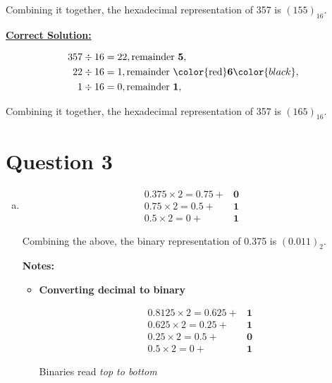 \documentclass[12pt]{article}
\begin{document}
\begin{enumerate}[a.]
    Combining it together, the hexadecimal representation of 357 is $(155)_{16}$.

    \begin{mdframed}
        \underline{\textbf{Correct Solution:}}

        \bigskip

        \begin{align*}
            357 \div 16 &= 22, \text{remainder \textbf{5}},\\
            22 \div 16 &= 1, \text{remainder \color{red}\textbf{6}}\color{black},\\
            1 \div 16 &= 0, \text{remainder \textbf{1}},\\
        \end{align*}

        Combining it together, the hexadecimal representation of 357 is \color{red}\textbf{$(165)_{16}$}\color{black}.

    \end{mdframed}

\end{enumerate}

\section*{Question 3}
\begin{enumerate}[a.]
    \item
    \setcounter{equation}{0}
    \begin{align}
        0.375 \times 2 = 0.75 + &\textbf{0}\\
        0.75 \times 2 = 0.5 + &\textbf{1}\\
        0.5 \times 2 = 0 + &\textbf{1}
    \end{align}

    Combining the above, the binary representation of 0.375 is $(0.011)_2$.

    \textbf{Notes:}
    \begin{itemize}
        \item \textbf{Converting decimal to binary}

        \begin{align}
            0.8125 \times 2 = 0.625 + &\textbf{1}\\
            0.625 \times 2 = 0.25 + &\textbf{1}\\
            0.25 \times 2 = 0.5 + &\textbf{0}\\
            0.5 \times 2 = 0 + &\textbf{1}
        \end{align}

        Binaries read \textit{top to bottom}
    \end{itemize}

\end{enumerate}
\end{document}

